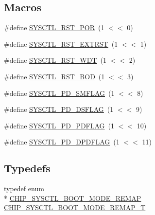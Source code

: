 \subsection*{Macros}
\begin{DoxyCompactItemize}
\item 
\#define \hyperlink{group__SYSCTL__17XX__40XX_gaeb159c3928c725d8e218dbb5426f99b8}{S\-Y\-S\-C\-T\-L\-\_\-\-R\-S\-T\-\_\-\-P\-O\-R}~(1 $<$$<$ 0)
\item 
\#define \hyperlink{group__SYSCTL__17XX__40XX_ga7e481a088f2ff36fc65b77dbb25a749a}{S\-Y\-S\-C\-T\-L\-\_\-\-R\-S\-T\-\_\-\-E\-X\-T\-R\-S\-T}~(1 $<$$<$ 1)
\item 
\#define \hyperlink{group__SYSCTL__17XX__40XX_ga84b4a0f567758052c1f4097d51aaa1ae}{S\-Y\-S\-C\-T\-L\-\_\-\-R\-S\-T\-\_\-\-W\-D\-T}~(1 $<$$<$ 2)
\item 
\#define \hyperlink{group__SYSCTL__17XX__40XX_gab1441ee02763d5fa7073bcf026036784}{S\-Y\-S\-C\-T\-L\-\_\-\-R\-S\-T\-\_\-\-B\-O\-D}~(1 $<$$<$ 3)
\item 
\#define \hyperlink{group__SYSCTL__17XX__40XX_gab8cdb571c0a7cd9485523882eb033f79}{S\-Y\-S\-C\-T\-L\-\_\-\-P\-D\-\_\-\-S\-M\-F\-L\-A\-G}~(1 $<$$<$ 8)
\item 
\#define \hyperlink{group__SYSCTL__17XX__40XX_ga25e12d7c7721dd11b00c5a7a8ec51457}{S\-Y\-S\-C\-T\-L\-\_\-\-P\-D\-\_\-\-D\-S\-F\-L\-A\-G}~(1 $<$$<$ 9)
\item 
\#define \hyperlink{group__SYSCTL__17XX__40XX_ga64388699b0fcd5317d80927e6c8a1db9}{S\-Y\-S\-C\-T\-L\-\_\-\-P\-D\-\_\-\-P\-D\-F\-L\-A\-G}~(1 $<$$<$ 10)
\item 
\#define \hyperlink{group__SYSCTL__17XX__40XX_ga6b2596afa60ba5439b3bb53e88df3e62}{S\-Y\-S\-C\-T\-L\-\_\-\-P\-D\-\_\-\-D\-P\-D\-F\-L\-A\-G}~(1 $<$$<$ 11)
\end{DoxyCompactItemize}
\subsection*{Typedefs}
\begin{DoxyCompactItemize}
\item 
typedef enum \\*
\hyperlink{group__SYSCTL__17XX__40XX_ga08779259bb52e97fa1491aa0047da2c6}{C\-H\-I\-P\-\_\-\-S\-Y\-S\-C\-T\-L\-\_\-\-B\-O\-O\-T\-\_\-\-M\-O\-D\-E\-\_\-\-R\-E\-M\-A\-P} \hyperlink{group__SYSCTL__17XX__40XX_gaacc03dffa90a522f3fc992e9940d196e}{C\-H\-I\-P\-\_\-\-S\-Y\-S\-C\-T\-L\-\_\-\-B\-O\-O\-T\-\_\-\-M\-O\-D\-E\-\_\-\-R\-E\-M\-A\-P\-\_\-\-T}
\end{DoxyCompactItemize}
